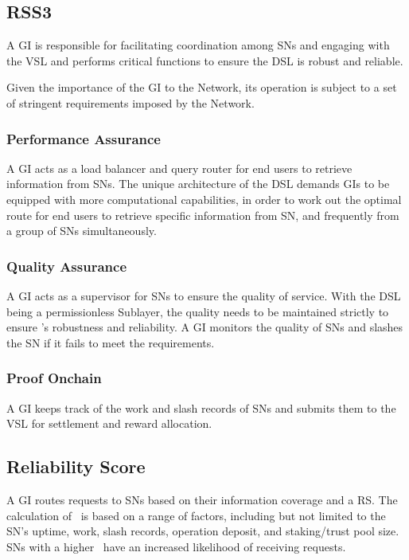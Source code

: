 \subsection{RSS3 }
\label{subsec:GI}

A \gls{GI} is responsible for facilitating coordination among \glspl{SN} and engaging with the \gls{VSL} and performs critical functions to ensure the \gls{DSL} is robust and reliable.

Given the importance of the \gls{GI} to the Network, its operation is subject to a set of stringent requirements imposed by the Network.

\subsubsection{Performance Assurance} A GI acts as a load balancer and query router for end users to retrieve information from \glspl{SN}.
The unique architecture of the \gls{DSL} demands \glspl{GI} to be equipped with more computational capabilities, in order to work out the optimal route for end users to retrieve specific information from \gls{SN}, and frequently from a group of \glspl{SN} simultaneously.

\subsubsection{Quality Assurance} A GI acts as a supervisor for \glspl{SN} to ensure the quality of service.
With the \gls{DSL} being a permissionless Sublayer, the quality needs to be maintained strictly to ensure 's robustness and reliability.
A \gls{GI} monitors the quality of \glspl{SN} and slashes the \gls{SN} if it fails to meet the requirements.

\subsubsection{Proof Onchain} A GI keeps track of the work and slash records of \glspl{SN} and submits them to the \gls{VSL} for settlement and reward allocation.

\subsection{Reliability Score}

A \gls{GI} routes requests to \glspl{SN} based on their information coverage and a \gls{RS}.
The calculation of \reliabilityScore\ is based on a range of factors, including but not limited to the \gls{SN}'s uptime, work, slash records, operation deposit, and staking/trust pool size.
\glspl{SN} with a higher \reliabilityScore\ have an increased likelihood of receiving requests.
